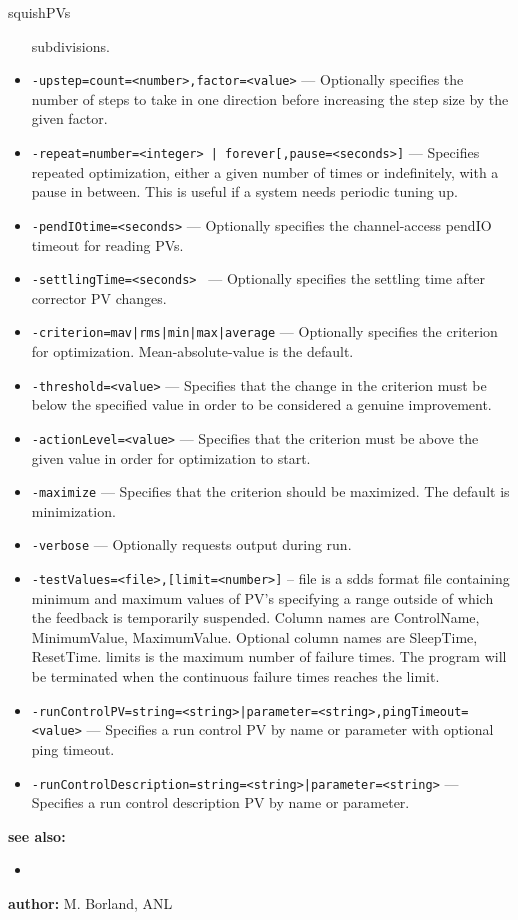 \begin{sddsprog}{squishPVs}
\begin{itemize}
                     subdivisions.
  \item {\tt -upstep=count=<number>,factor=<value>} --- Optionally specifies the number of steps
                to take in one direction before increasing the step size by the given factor.
  \item {\tt -repeat={number=<integer> | forever}[,pause=<seconds>]} --- Specifies repeated
                optimization, either a given number of times or indefinitely, with a pause in between.
                This is useful if a system needs periodic tuning up.
  \item {\tt -pendIOtime=<seconds>} --- Optionally specifies the channel-access pendIO timeout for reading PVs.
  \item {\tt -settlingTime=<seconds> } --- Optionally specifies the settling time after corrector PV changes.
  \item {\tt -criterion={mav|rms|min|max|average}} --- Optionally specifies the criterion for optimization.
                Mean-absolute-value is the default.
  \item {\tt -threshold=<value>} --- Specifies that the change in the criterion must be below the specified
        value in order to be considered a genuine improvement.
  \item {\tt -actionLevel=<value>} --- Specifies that the criterion must be above the given value
        in order for optimization to start.
  \item {\tt -maximize} --- Specifies that the criterion should be maximized.  The default is
                minimization.
  \item {\tt -verbose} --- Optionally requests output during run.
  \item {\tt -testValues=<file>,[limit=<number>]} --
                     file is a sdds format file containing minimum and maximum values
                     of PV's specifying a range outside of which the feedback
                     is temporarily suspended. Column names are ControlName,
                     MinimumValue, MaximumValue. Optional column names are
                     SleepTime, ResetTime.
                     limits is the maximum number of failure times. The program will be
                     terminated when the continuous failure times reaches the limit.
  \item {\tt -runControlPV={string=<string>|parameter=<string>},pingTimeout=<value>} ---
                    Specifies a run control PV by name or parameter with optional ping timeout.
  \item {\tt -runControlDescription={string=<string>|parameter=<string>}} ---
                    Specifies a run control description PV by name or parameter.
\end{itemize}

\item \textbf{see also:}
\begin{itemize}
  \item {}
\end{itemize}
\item \textbf{author:} M. Borland, ANL
\end{sddsprog}
